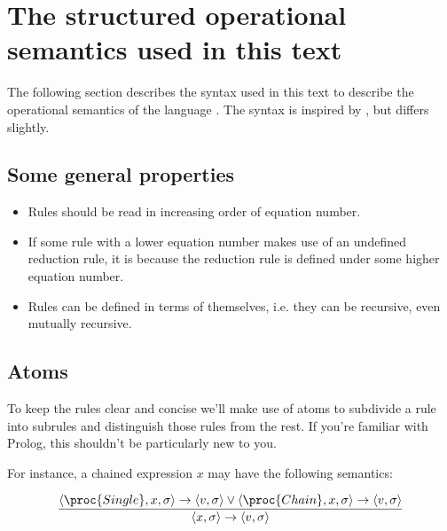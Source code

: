 \section{The structured operational semantics used in this text}\label{appendix:sos}

The following section describes the syntax used in this text to describe the
operational semantics of the language \D{}. The syntax is inspired by
\cite{sos}, but differs slightly.

\subsection{Some general properties}

\begin{itemize}

\item Rules should be read in increasing order of equation number.

\item If some rule with a lower equation number makes use of an undefined
reduction rule, it is because the reduction rule is defined under some higher
equation number.

\item Rules can be defined in terms of themselves, i.e. they can be recursive,
even mutually recursive.

\end{itemize}

\subsection{Atoms}\label{appendix:sos:atoms}

To keep the rules clear and concise we'll make use of atoms to subdivide a rule
into subrules and distinguish those rules from the rest. If you're familiar
with Prolog, this shouldn't be particularly new to you.

For instance, a chained expression $x$ may have the following semantics: 

\begin{equation}\label{appendix:equation:expression}
{\displaystyle
  \left\langle \proc{Single}, x,\sigma\right\rangle
  \rightarrow
  \left\langle v,\sigma\right\rangle
\vee
  \left\langle \proc{Chain}, x,\sigma\right\rangle
  \rightarrow
  \left\langle v,\sigma\right\rangle
\over\displaystyle
  \left\langle x,\sigma\right\rangle
  \rightarrow
  \left\langle v,\sigma\right\rangle
}
\end{equation}

